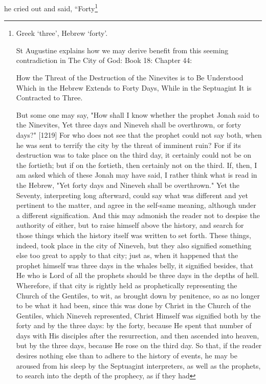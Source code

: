 \documentclass[
]{article}
\newcommand{\RL}[1]{\beginR #1\endR}
\begin{document}
he cried out and said, \RL{``}Forty\footnote{Greek `three', Hebrew
  `forty'.

  St Augustine explains how we may derive benefit from this seeming
  contradiction in The City of God: Book 18: Chapter 44:

  How the Threat of the Destruction of the Ninevites is to Be Understood
  Which in the Hebrew Extends to Forty Days, While in the Septuagint It
  is Contracted to Three.

  But some one may say, "How shall I know whether the prophet Jonah said
  to the Ninevites, Yet three days and Nineveh shall be
  overthrown,\textquotesingle{} or forty days?" {[}1219{]} For who does
  not see that the prophet could not say both, when he was sent to
  terrify the city by the threat of imminent ruin? For if its
  destruction was to take place on the third day, it certainly could not
  be on the fortieth; but if on the fortieth, then certainly not on the
  third. If, then, I am asked which of these Jonah may have said, I
  rather think what is read in the Hebrew, "Yet forty days and Nineveh
  shall be overthrown." Yet the Seventy, interpreting long afterward,
  could say what was different and yet pertinent to the matter, and
  agree in the self-same meaning, although under a different
  signification. And this may admonish the reader not to despise the
  authority of either, but to raise himself above the history, and
  search for those things which the history itself was written to set
  forth. These things, indeed, took place in the city of Nineveh, but
  they also signified something else too great to apply to that city;
  just as, when it happened that the prophet himself was three days in
  the whale\textquotesingle s belly, it signified besides, that He who
  is Lord of all the prophets should be three days in the depths of
  hell. Wherefore, if that city is rightly held as prophetically
  representing the Church of the Gentiles, to wit, as brought down by
  penitence, so as no longer to be what it had been, since this was done
  by Christ in the Church of the Gentiles, which Nineveh represented,
  Christ Himself was signified both by the forty and by the three days:
  by the forty, because He spent that number of days with His disciples
  after the resurrection, and then ascended into heaven, but by the
  three days, because He rose on the third day. So that, if the reader
  desires nothing else than to adhere to the history of events, he may
  be aroused from his sleep by the Septuagint interpreters, as well as
  the prophets, to search into the depth of the prophecy, as if they had
}
\end{document}

